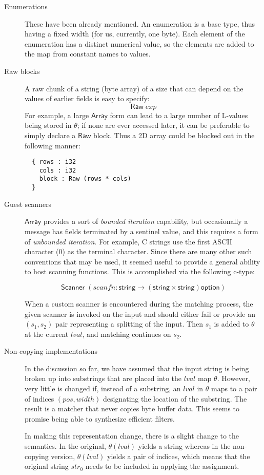 \documentclass[svgnames]{llncs}
\newcommand{\konst}[1]{\ensuremath{\mathsf{#1}}}
\newcommand{\lval}{\ensuremath{\mathit{lval}}}
\begin{document}
\begin{description}

\item [Enumerations] These have been already mentioned. An enumeration
  is a base type, thus having a fixed width (for us, currently, one
  byte). Each element of the enumeration has a distinct numerical
  value, so the elements are added to the map from constant names to values.

\item [Raw blocks] A raw chunk of a string (byte array) of a size that
  can depend on the values of earlier fields is easy to specify:
  \[ \konst{Raw}\; \mathit{exp} \]
For example, a large \konst{Array} form can lead to a large number of
L-values being stored in $\theta$; if none are ever accessed later, it
can be preferable to simply declare a \konst{Raw} block. Thus a 2D
array could be blocked out in the following manner:

\begin{verbatim}
  { rows : i32
    cols : i32
    block : Raw (rows * cols)
  }
\end{verbatim}

\item [Guest scanners] \konst{Array} provides a sort of \emph{bounded
  iteration} capability, but occasionally a message has fields
  terminated by a sentinel value, and this requires a form of
  \emph{unbounded iteration}. For example, C strings use the first
  ASCII character (0) as the terminal character. Since there are many
  other such conventions that may be used, it seemed useful to provide
  a general ability to host scanning functions. This is accomplished via the following c-type:

  \[ \konst{Scanner}\;
     (\mathit{scanfn} : \konst{string} \to (\konst{string} \times \konst{string})\konst{option}) \]

  When a custom scanner is encountered during the matching process,
  the given scanner is invoked on the input and should either fail or
  provide an $(s_1,s_2)$ pair representing a splitting of the
  input. Then $s_1$ is added to $\theta$ at the current \lval, and
  matching continues on $s_2$.

\item [Non-copying implementations] In the discussion so far, we have
  assumed that the input string is being broken up into substrings
  that are placed into the \lval{} map $\theta$. However, very little
  is changed if, instead of a substring, an \lval{} in $\theta$ maps
  to a pair of indices $(\mathit{pos},\mathit{width})$ designating the
  location of the substring. The result is a matcher that never copies
  byte buffer data. This seems to promise being able to synthesize
  efficient filters.

  In making this representation change, there is a slight change to
  the semantics. In the original, $\theta(\lval)$ yields a string
  whereas in the non-copying version, $\theta(\lval)$ yields a pair of
  indices, which means that the original string $\mathit{str}_0$ needs
  to be included in applying the assignment.
\end{description}
\end{document}

